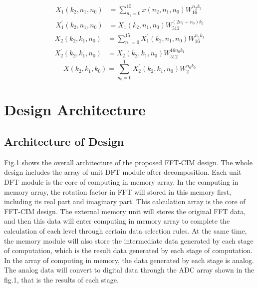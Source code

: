 \documentclass[journal]{IEEEtran}
\begin{document}
\begin{equation}
\begin{aligned}
    X_1(k_2,n_1,n_0) &= \sum_{n_2=0}^{15} x(n_2,n_1,n_0)W_{16}^{n_2k_2} \\
    X_1^{'}(k_2,n_1,n_0) &= X_1(k_2,n_1,n_0) W_{512}^{(2n_1 + n_0)k_2}
\end{aligned}
\end{equation}
\begin{equation}
\begin{aligned}
    X_2(k_2,k_1,n_0) &= \sum_{n_1=0}^{15} X_1^{'}(k_2,n_1,n_0) W_{16}^{n_1k_1} \\
    X_2^{'}(k_2,k_1,n_0) &= X_2(k_2,k_1,n_0) W_{512}^{16n_0k_1}
\end{aligned}
\end{equation}
\begin{equation}
    X(k_2,k_1,k_0) = \sum_{n_0=0}^{1} X_2^{'}(k_2,k_1,n_0) W_{2}^{n_0k_0}
\end{equation}


\section{Design Architecture}
\subsection{Architecture of Design}
Fig.1 shows the overall architecture of the proposed FFT-CIM design. The whole design includes the array of unit DFT module after decomposition. Each unit DFT module is the core of computing in memory array. In the computing in memory array, the rotation factor in FFT will stored in this memory first, including its real part and imaginary part. This calculation array is the core of FFT-CIM design. The external memory unit will stores the original FFT data, and then this data will enter computing in memory array to complete the calculation of each level through certain data selection rules. At the same time, the memory module will also store the intermediate data generated by each stage of computation, which is the result data generated by each stage of computation. In the array of computing in memory, the data generated by each stage is analog. The analog data will convert to digital data through the ADC array shown in the fig.1, that is the results of each stage.
\end{document}
